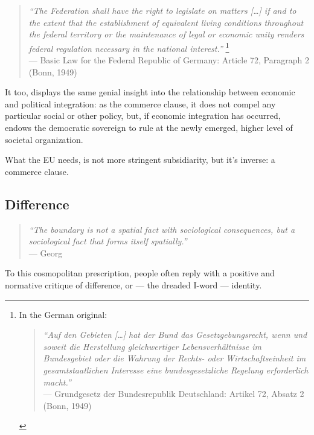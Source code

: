 \documentclass[11pt,a4paper,oneside,openright]{article}
\begin{document}
\begin{quote}
	\emph{``The Federation shall have the right to legislate on matters [\ldots] if and to the extent that the establishment of equivalent living conditions throughout the federal territory or the maintenance of legal or economic unity renders federal regulation necessary in the national interest.''}
	\footnote{
		In the German original:
		\begin{quote}
		\emph{``Auf den Gebieten [\ldots] hat der Bund das Gesetzgebungsrecht, wenn und soweit die Herstellung gleichwertiger Lebensverhältnisse im Bundesgebiet oder die Wahrung der Rechts- oder Wirtschaftseinheit im gesamtstaatlichen Interesse eine bundesgesetzliche Regelung erforderlich macht.''}\\
		--- Grundgesetz der Bundesrepublik Deutschland: Artikel 72, Absatz 2 (Bonn, 1949)
		\end{quote}
	}\\
	--- Basic Law for the Federal Republic of Germany: Article 72, Paragraph 2 (Bonn, 1949)
\end{quote}

It too, displays the same genial insight into the relationship between economic and political integration: 
as the commerce clause, it does not compel any particular social or other policy, but, if economic integration has occurred, endows the democratic sovereign to rule at the newly emerged, higher level of societal organization.


What the \gls{EU} needs, is not more stringent subsidiarity, but it's inverse: 
a commerce clause.

\subsection[Difference]{Difference} \label{sec:ID-Difference} 

\begin{quote}
	\emph{``The boundary is not a spatial fact with sociological consequences, but a sociological fact that forms itself spatially.''} \\
	--- Georg \cite[142]{Simmel1903}
\end{quote}

To this cosmopolitan prescription, people often reply with a positive and normative critique of difference, or --- the dreaded I-word --- identity. 
\end{document}
